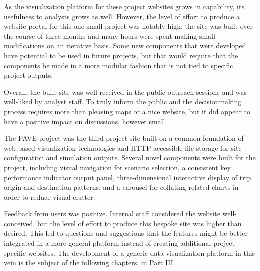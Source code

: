 As the visualization platform for these project websites grows in capability, its usefulness to analysts grows as well. However, the level of effort to produce a website portal for this one small project was notably high: the site was built over the course of three months and many hours were spent making small modifications on an iterative basis. Some new components that were developed have potential to be used in future projects, but that would require that the components be made in a more modular fashion that is not tied to specific project outputs.

Overall, the built site was well-received in the public outreach sessions and was well-liked by analyst staff. To truly inform the public and the decisionmaking process requires more than pleasing maps or a nice website, but it did appear to have a positive impact on discussions, however small.

The PAVE project was the third project site built on a common foundation of web-based visualization technologies and HTTP-accessible file storage for site configuration and simulation outputs. Several novel components were built for the project, including visual navigation for scenario selection, a consistent key performance indicator output panel, three-dimensional interactive display of trip origin and destination patterns, and a carousel for collating related charts in order to reduce visual clutter.

Feedback from users was positive. Internal staff considered the website well-conceived, but the level of effort to produce this bespoke site was higher than desired. This led to questions and suggestions that the features might be better integrated in a more general platform instead of creating additional project-specific websites. The development of a generic data visualization platform in this vein is the subject of the following chapters, in Part III.
